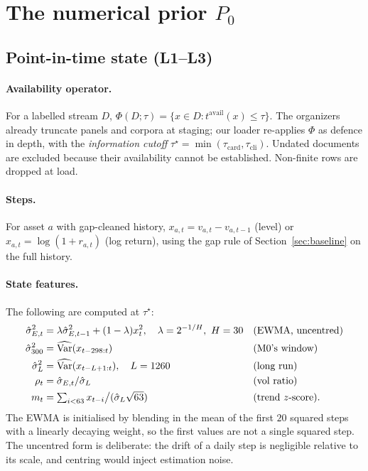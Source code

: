 \section{The numerical prior $P_0$}\label{sec:numerical}

\subsection{Point-in-time state (L1--L3)}

\paragraph{Availability operator.} For a labelled stream $D$, $\Phi(D;\tau)=\{x\in D: t^{\mathrm{avail}}(x)\le\tau\}$. The organizers already
truncate panels and corpora at staging; our loader re-applies $\Phi$ as defence in depth, with the \emph{information cutoff}
$\tau^\star=\min(\tau_{\text{card}},\tau_{\text{cli}})$. Undated documents are excluded because their availability cannot be established.
Non-finite rows are dropped at load.

\paragraph{Steps.} For asset $a$ with gap-cleaned history, $x_{a,t}=v_{a,t}-v_{a,t-1}$ (level) or $x_{a,t}=\log(1+r_{a,t})$ (log return), using
the gap rule of Section~\ref{sec:baseline} on the full history.

\paragraph{State features.} The following are computed at $\tau^\star$:
\begin{align}
  \hat\sigma^2_{E,t} &= \lambda\hat\sigma^2_{E,t-1}+(1-\lambda)x_t^2,\quad \lambda=2^{-1/H},\ H=30 &&\text{(EWMA, uncentred)}\\
  \hat\sigma^2_{300} &= \widehat{\Var}(x_{t-298:t}) &&\text{(M0's window)}\\
  \hat\sigma^2_{L} &= \widehat{\Var}(x_{t-L+1:t}),\quad L=1260 &&\text{(long run)}\\
  \rho_t &= \hat\sigma_{E,t}/\hat\sigma_{L} &&\text{(vol ratio)}\\
  m_t &= \textstyle\sum_{i<63}x_{t-i}\big/(\hat\sigma_L\sqrt{63}) &&\text{(trend $z$-score)}.
\end{align}
The EWMA is initialised by blending in the mean of the first $20$ squared steps with a linearly decaying weight, so the first values are not a
single squared step. The uncentred form is deliberate: the drift of a daily step is negligible relative to its scale, and centring would inject
estimation noise.

